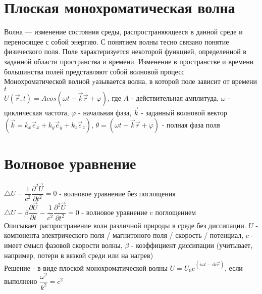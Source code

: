 \newcommand{\colontitulAutors}{astronom\_v\_cube,~edombek}
\newcommand{\colontitulYear}{2023~}
\newcommand{\colontitulEducationalSubject}{Физика волновых процессов}
\newcommand{\colontitulTeacher}{Петров Е. Ю.}



\newcommand{\rot}{\operatorname{rot}}


	\small
	\begin{multicols*}{2}

		\section{Плоская монохроматическая волна}
		Волна — изменение состояния среды, распространяющееся в данной среде и переносящее с собой энергию. С понятием волны тесно связано понятие физического поля. Поле характеризуется некоторой функцией, определенной в заданной области пространства и времени. Изменение в пространстве и времени большинства полей представляют собой волновой процесс\\
		Монохроматической волной yазывается волна, в которой поле зависит от времени $t$\\
		$U(\vec{r}, t) = A cos(\omega t - \vec{k} \vec{r} + \varphi )$, где $A$ - действительная амплитуда, $\omega$ - циклическая частота, $\varphi $ - начальная фаза, $\vec{k}$ - заданный волновой вектор $(\vec{k} = k_x \vec{e}_x + k_y \vec{e}_y + k_z \vec{e}_z)$, $\theta = (\omega t - \vec{k} \vec{r} + \varphi )$ - полная фаза поля

		\section{Волновое уравнение}
		$\bigtriangleup U - \dfrac{1}{c^2} \dfrac{\partial^2 \vec{U}}{\partial t^2} = 0$ - волновое уравнение без поглощения\\
		$\bigtriangleup U - \beta\dfrac{\partial\vec{U}}{\partial t} -\dfrac{1}{c^2} \dfrac{\partial^2 \vec{U}}{\partial t^2} = 0$ - волновое уравнение c поглощением\\
		Описывает распространение волн различной природы в среде без диссипации.
		$U$ - компонента электрического поля / магнитоного поля / скорость / потенциал, $c$ - имеет смысл фазовой скорости волны, $\beta$ - коэффициент диссипации (учитывает, например, потери в вязкой среди или на нагрев)\\
		Решение - в виде плоской монохроматической волны $U = U_0 e^{(i\omega t - i k \vec{r})}$, если выполнено $\dfrac{\omega^2}{k^2} = c^2$


\end{multicols*}
